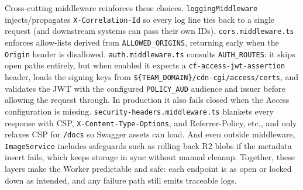 \documentclass[12pt]{article}
\begin{document}
Cross-cutting middleware reinforces these choices. \texttt{loggingMiddleware} injects/propagates \texttt{X-Correlation-Id} so every log line ties back to a single request (and downstream systems can pass their own IDs). \texttt{cors.middleware.ts} enforces allow-lists derived from \texttt{ALLOWED\_ORIGINS}, returning early when the \texttt{Origin} header is disallowed. \texttt{auth.middleware.ts} consults \texttt{AUTH\_ROUTES}: it skips open paths entirely, but when enabled it expects a \texttt{cf-access-jwt-assertion} header, loads the signing keys from \texttt{\$\{TEAM\_DOMAIN\}/cdn-cgi/access/certs}, and validates the JWT with the configured \texttt{POLICY\_AUD} audience and issuer before allowing the request through. In production it also fails closed when the Access configuration is missing. \texttt{security-headers.middleware.ts} blankets every response with CSP, \texttt{X-Content-Type-Options}, and Referrer-Policy, etc., and only relaxes CSP for \texttt{/docs} so Swagger assets can load. And even outside middleware, \texttt{ImageService} includes safeguards such as rolling back R2 blobs if the metadata insert fails, which keeps storage in sync without manual cleanup. Together, these layers make the Worker predictable and safe: each endpoint is as open or locked down as intended, and any failure path still emits traceable logs.
\end{document}
